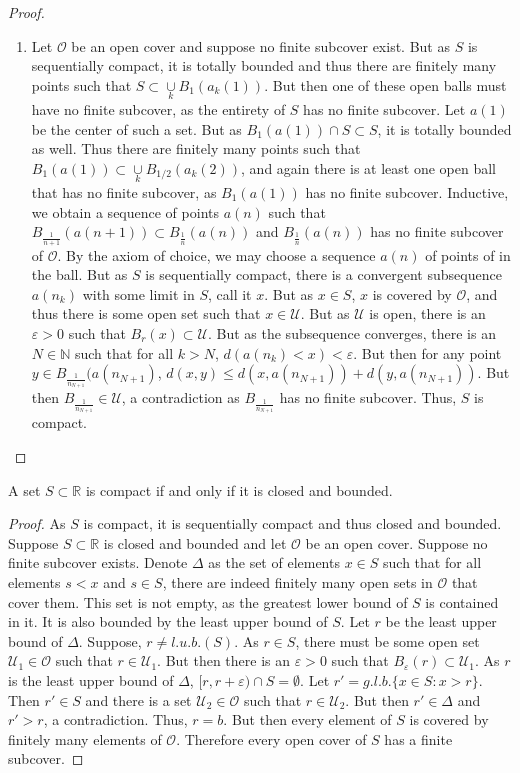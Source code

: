 \documentclass[crop=false,class=article,oneside]{standalone}
\begin{document}
\begin{proof}
\begin{enumerate}
        \item Let $\mathcal{O}$ be an open cover and suppose no finite subcover exist. But as $S$ is sequentially compact, it is totally bounded and thus there are finitely many points such that $S\subset \underset{k}\cup B_{1}(a_k(1))$. But then one of these open balls must have no finite subcover, as the entirety of $S$ has no finite subcover. Let $a(1)$ be the center of such a set. But as $B_{1}(a(1))\cap S \subset S$, it is totally bounded as well. Thus there are finitely many points such that $B_{1}(a(1))\subset \underset{k}\cup B_{1/2}(a_k(2))$, and again there is at least one open ball that has no finite subcover, as $B_{1}(a(1))$ has no finite subcover. Inductive, we obtain a sequence of points $a(n)$ such that $B_{\frac{1}{n+1}}(a(n+1))\subset B_{\frac{1}{n}}(a(n))$ and $B_{\frac{1}{n}}(a(n))$ has no finite subcover of $\mathcal{O}$. By the axiom of choice, we may choose a sequence $a(n)$ of points of in the ball. But as $S$ is sequentially compact, there is a convergent subsequence $a(n_k)$ with some limit in $S$, call it $x$. But as $x\in S$, $x$ is covered by $\mathcal{O}$, and thus there is some open set such that $x\in \mathcal{U}$. But as $\mathcal{U}$ is open, there is an $\varepsilon>0$ such that $B_{r}(x)\subset \mathcal{U}$. But as the subsequence converges, there is an $N\in \mathbb{N}$ such that for all $k>N$, $d(a(n_k)<x) < \varepsilon$. But then for any point $y\in B_{\frac{1}{n_{N+1}}}(a(n_{N+1})$, $d(x,y) \leq d(x,a(n_{N+1}))+d(y,a(n_{N+1}))$. But then $B_{\frac{1}{n_{N+1}}}\in \mathcal{U}$, a contradiction as $B_{\frac{1}{n_{N+1}}}$ has no finite subcover. Thus, $S$ is compact. 
        \end{enumerate}
        \end{proof}
        \begin{theorem}
        A set $S\subset \mathbb{R}$ is compact if and only if it is closed and bounded.
        \end{theorem}
        \begin{proof}
        As $S$ is compact, it is sequentially compact and thus closed and bounded. Suppose $S\subset \mathbb{R}$ is closed and bounded and let $\mathcal{O}$ be an open cover. Suppose no finite subcover exists. Denote $\Delta$ as the set of elements $x\in S$ such that for all elements $s<x$ and $s\in S$, there are indeed finitely many open sets in $\mathcal{O}$ that cover them. This set is not empty, as the greatest lower bound of $S$ is contained in it. It is also bounded by the least upper bound of $S$. Let $r$ be the least upper bound of $\Delta$. Suppose, $r\ne l.u.b.(S)$. As $r\in S$, there must be some open set $\mathcal{U}_1\in \mathcal{O}$ such that $r\in \mathcal{U}_1$. But then there is an $\varepsilon>0$ such that $B_{\varepsilon}(r) \subset \mathcal{U}_1$. As $r$ is the least upper bound of $\Delta$, $[r,r+\varepsilon)\cap S = \emptyset$. Let $r' = g.l.b.\{x\in S: x>r\}$. Then $r'\in S$ and there is a set $\mathcal{U}_2 \in \mathcal{O}$ such that $r\in \mathcal{U}_2$. But then $r' \in \Delta$ and $r'>r$, a contradiction. Thus, $r=b$. But then every element of $S$ is covered by finitely many elements of $\mathcal{O}$. Therefore every open cover of $S$ has a finite subcover.
        \end{proof}
\end{document}
